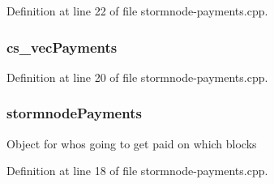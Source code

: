 Definition at line 22 of file stormnode-\/payments.\+cpp.

\hypertarget{stormnode-payments_8cpp_ad7b9616c84ed22224772799b69d7cbeb}{}
\subsubsection[{cs\+\_\+vec\+Payments}]{ cs\+\_\+vec\+Payments}\label{stormnode-payments_8cpp_ad7b9616c84ed22224772799b69d7cbeb}


Definition at line 20 of file stormnode-\/payments.\+cpp.

\hypertarget{stormnode-payments_8cpp_a1d528b1b067a2f669dfd90c513a97116}{}
\subsubsection[{stormnode\+Payments}]{ stormnode\+Payments}\label{stormnode-payments_8cpp_a1d528b1b067a2f669dfd90c513a97116}
Object for who\textquotesingle{}s going to get paid on which blocks 

Definition at line 18 of file stormnode-\/payments.\+cpp.

